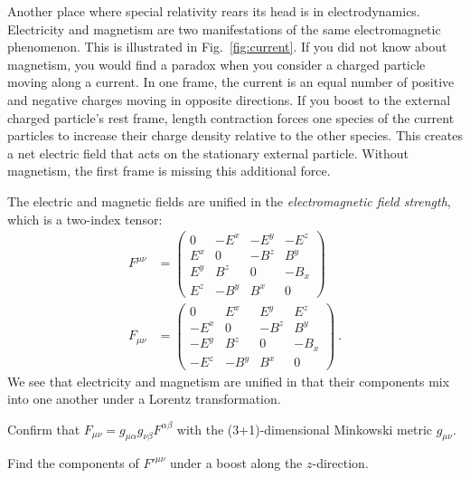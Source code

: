 \documentclass[12pt, oneside]{report}    %
\begin{document}
\begin{subappendices}
Another place where special relativity rears its head is in electrodynamics. Electricity and magnetism are two manifestations of the same electromagnetic phenomenon. This is illustrated in Fig.~\ref{fig:current}. If you did not know about magnetism, you would find a paradox when you consider a charged particle moving along a current. In one frame, the current is an equal number of positive and negative charges moving in opposite directions. If you boost to the external charged particle's rest frame, length contraction forces one species of the current particles to increase their charge density relative to the other species. This creates a net electric field that acts on the stationary external particle. Without magnetism, the first frame is missing this additional force. 

The electric and magnetic fields are unified in the \emph{electromagnetic field strength}, which is a two-index tensor:
\begin{align}
    F^{\mu\nu}
    &=
    \begin{pmatrix}
        0&-E^x&-E^y&-E^z\\
        E^x&0&-B^z&B^y\\
        E^y&B^z&0&-B_x\\
        E^z&-B^y&B^x&0
    \end{pmatrix} %
    \\
    F_{\mu\nu}
    &=
    \begin{pmatrix}
        0&E^x&E^y&E^z\\
        -E^x&0&-B^z&B^y\\
        -E^y&B^z&0&-B_x\\
        -E^z&-B^y&B^x&0
    \end{pmatrix} \ .
    \label{eq:fmunu:lower}
\end{align}
We see that electricity and magnetism are unified in that their components mix into one another under a Lorentz transformation. 
\begin{exercise}
Confirm that $F_{\mu\nu} =g_{\mu \alpha}g_{\nu\beta} F^{\alpha\beta}$ with the (3+1)-dimensional Minkowski metric $g_{\mu\nu}$. 
\end{exercise}
\begin{exercise}
Find the components of $F'^{\mu\nu}$ under a boost along the $z$-direction. 
\end{exercise}



\end{subappendices}
\end{document}
